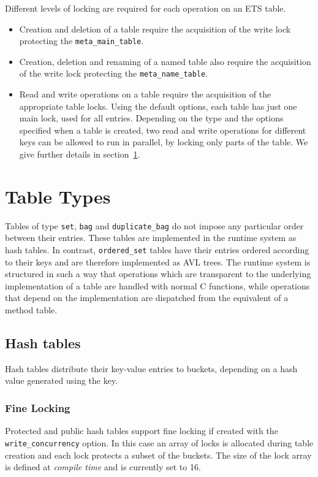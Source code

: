 \documentclass[aps,pre,preprint,nofootinbib]{revtex4}
\begin{document}
Different levels of locking are required for each operation on an ETS table.

\begin{itemize}
\item Creation and deletion of a table require the acquisition of the write lock protecting the \verb|meta_main_table|.
\item Creation, deletion and renaming of a named table also require the acquisition of the write lock protecting the \verb|meta_name_table|.
\item Read and write operations on a table require the acquisition of the appropriate table locks.
  Using the default options, each table has just one main lock, used for all entries.
  Depending on the type and the options specified when a table is created, two read and write operations for different keys can be allowed to run in parallel, by locking only parts of the table.
  We give further details in section~\ref{sec:table_types}.
\end{itemize}

\section{Table Types} \label{sec:table_types}

Tables of type \verb|set|, \verb|bag| and \verb|duplicate_bag| do not impose any particular order between their entries.
These tables are implemented in the runtime system as hash tables.
In contrast, \verb|ordered_set| tables have their entries ordered according to their keys and are therefore implemented as AVL trees.
The runtime system is structured in such a way that operations which are transparent to the underlying implementation of a table are handled with normal C functions, while operations that depend on the implementation are dispatched from the equivalent of a method table.

\subsection{Hash tables}

Hash tables distribute their key-value entries to buckets, depending on a hash value generated using the key.

\subsubsection{Fine Locking}

Protected and public hash tables support fine locking if created with the \verb|write_concurrency| option.
In this case an array of locks is allocated during table creation and each lock protects a subset of the buckets.
The size of the lock array is defined at \emph{compile time} and is currently set to 16.
\end{document}
